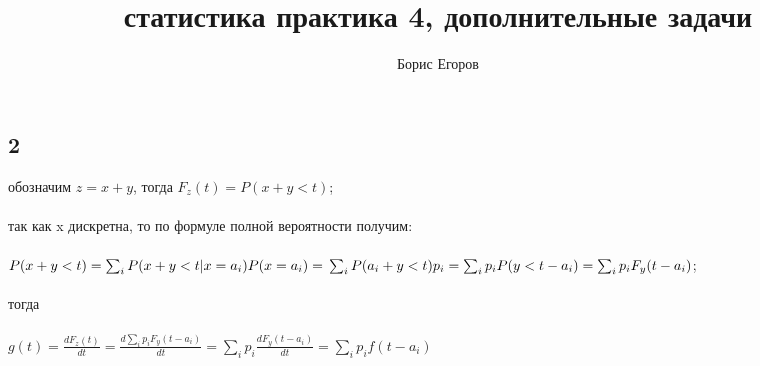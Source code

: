 \documentclass[a4paper]{article}
\author{Борис Егоров}
\title{статистика практика 4, дополнительные задачи}
\begin{document}
	\maketitle
	\begin{large}
	\section*{2}
	обозначим $z=x+y$, тогда $F_z(t)=P(x+y<t)$;\\\\
	так как x дискретна, то по формуле полной вероятности получим:\\\\
	$
	P(x+y<t)=\sum_{i}P(x+y<t|x=a_i)P(x=a_i)=\\\\
	\sum_{i}P(a_i+y<t)p_i=\sum_{i}p_iP(y<t-a_i)=\sum_{i}p_iF_y(t-a_i)
	$;\\\\
	тогда\\\\
	$
	g(t)=\frac{dF_z(t)}{dt}=\frac{d\sum_{i}p_iF_y(t-a_i)}{dt}=\sum_{i}p_i\frac{dF_y(t-a_i)}{dt}=\sum_{i}p_if(t-a_i)
	$
	\end{large}
\end{document}
